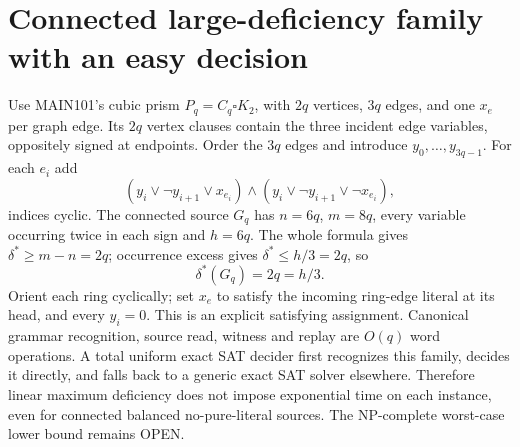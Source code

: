 \documentclass[11pt]{article}
\begin{document}
\section{Connected large-deficiency family with an easy decision}
Use MAIN101's cubic prism $P_q=C_q\square K_2$, with $2q$ vertices, $3q$ edges, and one $x_e$ per graph edge. Its $2q$ vertex clauses contain the three incident edge variables, oppositely signed at endpoints. Order the $3q$ edges and introduce $y_0,\dots,y_{3q-1}$. For each $e_i$ add
\[
(y_i\vee\neg y_{i+1}\vee x_{e_i})\wedge
(y_i\vee\neg y_{i+1}\vee\neg x_{e_i}),
\]
indices cyclic. The connected source $G_q$ has $n=6q$, $m=8q$, every variable occurring twice in each sign and $h=6q$. The whole formula gives $\delta^*\ge m-n=2q$; occurrence excess gives $\delta^*\le h/3=2q$, so
\[
\boxed{\delta^*(G_q)=2q=h/3}.
\]
Orient each ring cyclically; set $x_e$ to satisfy the incoming ring-edge literal at its head, and every $y_i=0$. This is an explicit satisfying assignment. Canonical grammar recognition, source read, witness and replay are $O(q)$ word operations. A total uniform exact SAT decider first recognizes this family, decides it directly, and falls back to a generic exact SAT solver elsewhere. Therefore linear maximum deficiency does not impose exponential time on each instance, even for connected balanced no-pure-literal sources. The NP-complete worst-case lower bound remains OPEN.
\end{document}
